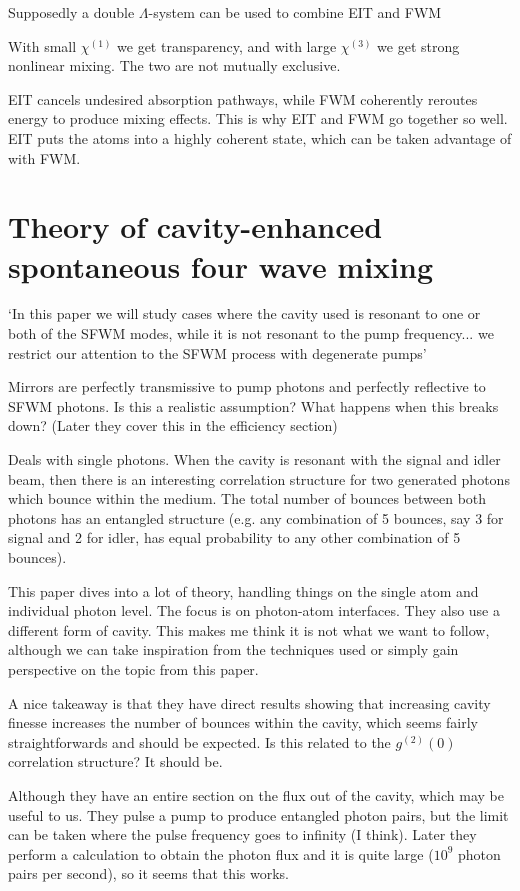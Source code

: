 \documentclass[aps,pra,twocolumn,showpacs,amsmath,amssymb,nofootinbib,longbibliography,superscriptaddress
]{revtex4-1}
\theoremstyle{definition}
\theoremstyle{remark}
\newcommand{\0}{\hat{0}}
\begin{document}
Supposedly a double $\Lambda$-system can be used to combine EIT and FWM

With small $\chi^{(1)}$ we get transparency, and with large $\chi^{(3)}$ we get strong nonlinear mixing. The two are not mutually exclusive.

EIT cancels undesired absorption pathways, while FWM coherently reroutes energy to produce mixing effects. This is why EIT and FWM go together so well. EIT puts the atoms into a highly coherent state, which can be taken advantage of with FWM.


\section{Theory of cavity-enhanced spontaneous four wave mixing}


`In this paper we will study cases where the cavity used is resonant to one or both of the SFWM modes, while it is not resonant to the pump frequency... we restrict our attention to the SFWM process with degenerate pumps'

Mirrors are perfectly transmissive to pump photons and perfectly reflective to SFWM photons. Is this a realistic assumption? What happens when this breaks down? (Later they cover this in the efficiency section)

Deals with single photons. When the cavity is resonant with the signal and idler beam, then there is an interesting correlation structure for two generated photons which bounce within the medium. The total number of bounces between both photons has an entangled structure (e.g. any combination of 5 bounces, say 3 for signal and 2 for idler, has equal probability to any other combination of 5 bounces).

This paper dives into a lot of theory, handling things on the single atom and individual photon level. The focus is on photon-atom interfaces. They also use a different form of cavity. This makes me think it is not what we want to follow, although we can take inspiration from the techniques used or simply gain perspective on the topic from this paper.

A nice takeaway is that they have direct results showing that increasing cavity finesse increases the number of bounces within the cavity, which seems fairly straightforwards and should be expected. Is this related to the $g^{(2)}(0)$ correlation structure? It should be.

Although they have an entire section on the flux out of the cavity, which may be useful to us. They pulse a pump to produce entangled photon pairs, but the limit can be taken where the pulse frequency goes to infinity (I think). Later they perform a calculation to obtain the photon flux and it is quite large ($10^9$ photon pairs per second), so it seems that this works.
\end{document}
